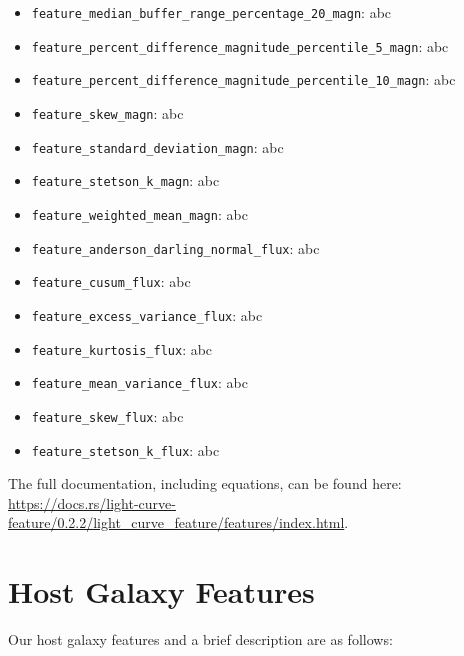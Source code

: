 \documentclass[twocolumn]{aastex63}
\begin{document}
\begin{itemize}
    \item \texttt{feature\_median\_buffer\_range\_percentage\_20\_magn}: abc
    \item \texttt{feature\_percent\_difference\_magnitude\_percentile\_5\_magn}: abc
    \item \texttt{feature\_percent\_difference\_magnitude\_percentile\_10\_magn}: abc
    \item \texttt{feature\_skew\_magn}: abc
    \item \texttt{feature\_standard\_deviation\_magn}: abc
    \item \texttt{feature\_stetson\_k\_magn}: abc
    \item \texttt{feature\_weighted\_mean\_magn}: abc
    \item \texttt{feature\_anderson\_darling\_normal\_flux}: abc
    \item \texttt{feature\_cusum\_flux}: abc
    \item \texttt{feature\_excess\_variance\_flux}: abc
    \item \texttt{feature\_kurtosis\_flux}: abc
    \item \texttt{feature\_mean\_variance\_flux}: abc
    \item \texttt{feature\_skew\_flux}: abc
    \item \texttt{feature\_stetson\_k\_flux}: abc
\end{itemize}


The full documentation, including equations, can be found here: \url{https://docs.rs/light-curve-feature/0.2.2/light_curve_feature/features/index.html}.


\section{Host Galaxy Features}
\label{appx:host_gal_features}


\renewcommand{\thefigure}{A.\arabic{figure}}
\setcounter{figure}{0}
\renewcommand{\thetable}{A.\arabic{table}} \setcounter{table}{0}

Our host galaxy features and a brief description are as follows:
\end{document}
